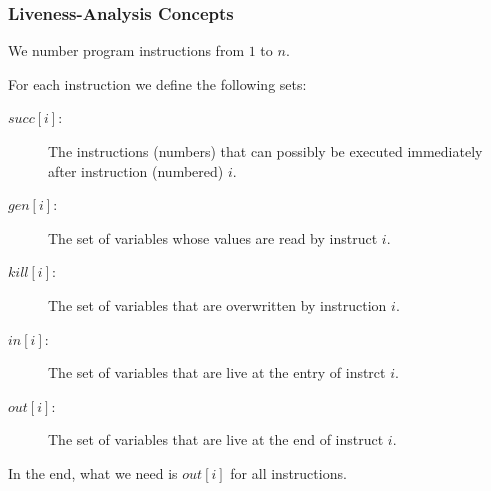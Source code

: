 \documentclass{beamer}
\newcommand{\emp}[1]{\textcolor{DikuRed}{ #1}}
\begin{document}
\begin{frame}[fragile,t]
   \frametitle{Liveness-Analysis Concepts}

\bigskip

\emp{We number program instructions from $1$ to $n$.}\smallskip

For each instruction we define the following sets:\smallskip

\begin{description}

    \item[\mbox{$succ[i]$:}] The instructions (numbers) that can possibly be
                executed immediately after instruction (numbered) $i$.\smallskip


    \item[\mbox{$gen[i]$:}] The set of variables whose values are read by instruct $i$.\smallskip


    \item[\mbox{$kill[i]$:}]The set of variables that are overwritten by instruction $i$.\smallskip


    \item[\mbox{$in[i]$:}] The set of variables that are live at the entry of instrct $i$.\smallskip


    \item[\mbox{$out[i]$:}] The set of variables that are live at the end of instruct $i$.

\end{description}

\bigskip

\emp{In the end, what we need is $out[i]$ for all instructions.}

\end{frame}
\end{document}
